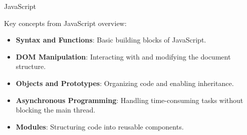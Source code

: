 \begin{notes}{JavaScript}
\begin{highlight}
    \end{highlight}
    
    \begin{highlight}
    
        Key concepts from JavaScript overview:
        
        \begin{itemize}
            \item \textbf{Syntax and Functions}: Basic building blocks of JavaScript.
            \item \textbf{DOM Manipulation}: Interacting with and modifying the document structure.
            \item \textbf{Objects and Prototypes}: Organizing code and enabling inheritance.
            \item \textbf{Asynchronous Programming}: Handling time-consuming tasks without blocking the main thread.
            \item \textbf{Modules}: Structuring code into reusable components.
        \end{itemize}
        
    \end{highlight}
\end{notes}